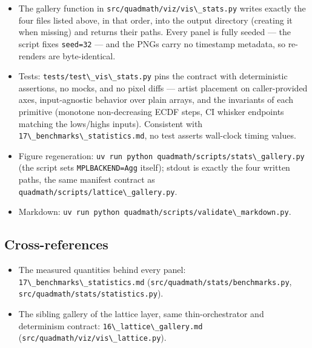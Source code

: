 \documentclass[
  10pt,
]{article}
\newcommand{\passthrough}[1]{#1}
\providecommand{\tightlist}{%
  \setlength{\itemsep}{0pt}\setlength{\parskip}{0pt}}
\begin{document}
\begin{itemize}
\tightlist
\item
  The gallery function in
  \passthrough{\lstinline!src/quadmath/viz/vis\_stats.py!} writes
  exactly the four files listed above, in that order, into the output
  directory (creating it when missing) and returns their paths. Every
  panel is fully seeded --- the script fixes
  \passthrough{\lstinline!seed=32!} --- and the PNGs carry no timestamp
  metadata, so re-renders are byte-identical.
\item
  Tests: \passthrough{\lstinline!tests/test\_vis\_stats.py!} pins the
  contract with deterministic assertions, no mocks, and no pixel diffs
  --- artist placement on caller-provided axes, input-agnostic behavior
  over plain arrays, and the invariants of each primitive (monotone
  non-decreasing ECDF steps, CI whisker endpoints matching the
  lows/highs inputs). Consistent with
  \passthrough{\lstinline!17\_benchmarks\_statistics.md!}, no test
  asserts wall-clock timing values.
\item
  Figure regeneration:
  \passthrough{\lstinline!uv run python quadmath/scripts/stats\_gallery.py!}
  (the script sets \passthrough{\lstinline!MPLBACKEND=Agg!} itself);
  stdout is exactly the four written paths, the same manifest contract
  as \passthrough{\lstinline!quadmath/scripts/lattice\_gallery.py!}.
\item
  Markdown:
  \passthrough{\lstinline!uv run python quadmath/scripts/validate\_markdown.py!}.
\end{itemize}

\subsection{Cross-references}\label{cross-references}

\begin{itemize}
\tightlist
\item
  The measured quantities behind every panel:
  \passthrough{\lstinline!17\_benchmarks\_statistics.md!}
  (\passthrough{\lstinline!src/quadmath/stats/benchmarks.py!},
  \passthrough{\lstinline!src/quadmath/stats/statistics.py!}).
\item
  The sibling gallery of the lattice layer, same thin-orchestrator and
  determinism contract:
  \passthrough{\lstinline!16\_lattice\_gallery.md!}
  (\passthrough{\lstinline!src/quadmath/viz/vis\_lattice.py!}).
\end{itemize}
\end{document}

